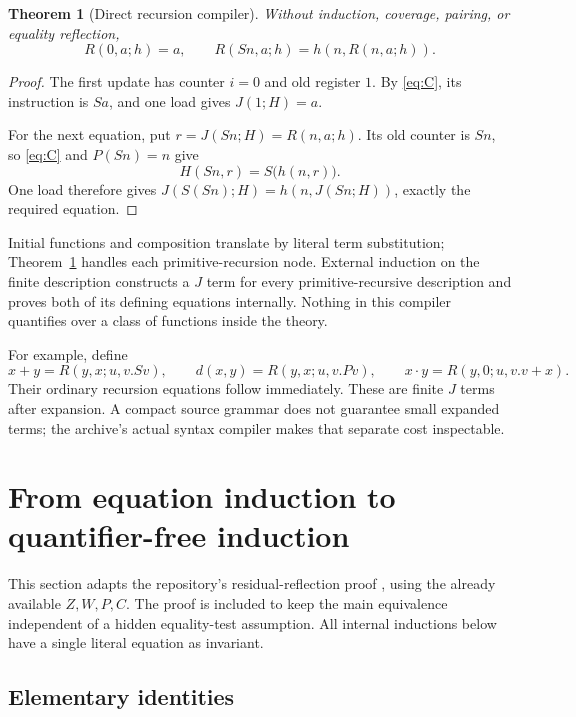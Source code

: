 \documentclass[11pt,letterpaper]{article}
\newtheorem{theorem}{Theorem}[section]
\theoremstyle{definition}\newtheorem{definition}[theorem]{Definition}
\theoremstyle{remark}\newtheorem{remark}[theorem]{Remark}
\begin{document}
\begin{theorem}[Direct recursion compiler]\label{thm:compiler}
Without induction, coverage, pairing, or equality reflection,
\[
 R(0,a;h)=a,\qquad R(Sn,a;h)=h(n,R(n,a;h)).
\]
\end{theorem}
\begin{proof}
The first update has counter $i=0$ and old register $1$. By
\eqref{eq:C}, its instruction is $Sa$, and one load gives
$J(1;H)=a$.

For the next equation, put $r=J(Sn;H)=R(n,a;h)$. Its old counter
is $Sn$, so \eqref{eq:C} and $P(Sn)=n$ give
\[
 H(Sn,r)=S\bigl(h(n,r)\bigr).
\]
One load therefore gives
$J(S(Sn);H)=h(n,J(Sn;H))$, exactly the required equation.
\end{proof}

Initial functions and composition translate by literal term substitution;
Theorem~\ref{thm:compiler} handles each primitive-recursion node.
External induction on the finite description constructs a $J$ term
for every primitive-recursive description and proves both of its
defining equations internally. Nothing in this compiler quantifies
over a class of functions inside the theory.

For example, define
\[
 x+y=R(y,x;u,v.Sv),\qquad
 d(x,y)=R(y,x;u,v.Pv),\qquad
 x\cdot y=R(y,0;u,v.v+x).
\]
Their ordinary recursion equations follow immediately. These are
finite $J$ terms after expansion. A compact source grammar does not
guarantee small expanded terms; the archive's actual syntax compiler
makes that separate cost inspectable.

\section{From equation induction to quantifier-free induction}\label{sec:reflection}

This section adapts the repository's residual-reflection proof
\cite{reflection}, using the already available $Z,W,P,C$. The proof
is included to keep the main equivalence independent of a hidden
equality-test assumption. All internal inductions below have a single
literal equation as invariant.

\subsection{Elementary identities}
\end{document}

